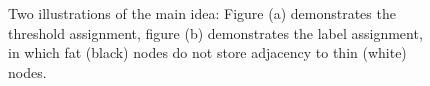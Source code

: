 \begin{figure}
\centering
{}
\caption{Two illustrations of the main idea: Figure (a) demonstrates the threshold assignment, figure (b) demonstrates the label assignment, in which fat (black) nodes do not store adjacency to thin (white) nodes.}
\end{figure}





